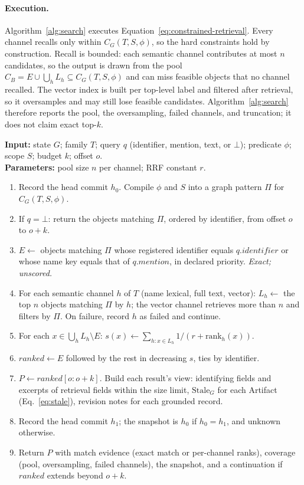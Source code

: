 \documentclass[sigconf,review,anonymous]{acmart}
\begin{document}
\paragraph{Execution.}
Algorithm~\ref{alg:search} executes Equation~\ref{eq:constrained-retrieval}.
Every channel recalls only within $C_G(T,S,\phi)$, so the hard constraints hold
by construction. Recall is bounded: each semantic channel contributes at most
$n$ candidates, so the output is drawn from the pool
$\widehat C_B = E\cup\bigcup_h L_h \subseteq C_G(T,S,\phi)$ and can miss
feasible objects that no channel recalled. The vector index is built per
top-level label and filtered after retrieval, so it oversamples and may still
lose feasible candidates. Algorithm~\ref{alg:search} therefore reports the
pool, the oversampling, failed channels, and truncation; it does not claim
exact top-$k$.

\begin{algorithm}[tbp]
\caption{\textsc{Search}: constrained hybrid retrieval}
\label{alg:search}
\raggedright
\textbf{Input:} state $G$; family $T$; query $q$ (identifier, mention, text,
or $\bot$); predicate $\phi$; scope $S$; budget $k$; offset $o$.\\
\textbf{Parameters:} pool size $n$ per channel; RRF constant $r$.
\begin{enumerate}
  \item Record the head commit $h_0$. Compile $\phi$ and $S$ into a graph
    pattern $\Pi$ for $C_G(T,S,\phi)$.
  \item If $q=\bot$: return the objects matching $\Pi$, ordered by
    identifier, from offset $o$ to $o+k$.
  \item $E\gets$ objects matching $\Pi$ whose registered identifier equals
    $q.\mathit{identifier}$ or whose name key equals that of
    $q.\mathit{mention}$, in declared priority. \hfill\emph{Exact; unscored.}
  \item For each semantic channel $h$ of $T$ (name lexical, full text,
    vector): $L_h\gets$ the top $n$ objects matching $\Pi$ by $h$; the vector
    channel retrieves more than $n$ and filters by $\Pi$. On failure, record
    $h$ as failed and continue.
  \item For each $x\in\bigcup_h L_h\setminus E$:
    $s(x)\gets\sum_{h: x\in L_h} 1/(r+\mathrm{rank}_h(x))$.
  \item $\mathit{ranked}\gets E$ followed by the rest in decreasing $s$, ties
    by identifier.
  \item $P\gets\mathit{ranked}[o:o+k]$. Build each result's view:
    identifying fields and excerpts of retrieval fields within the size
    limit, $\mathrm{Stale}_G$ for each Artifact
    (Eq.~\ref{eq:stale}), revision notes for each grounded record.
  \item Record the head commit $h_1$; the snapshot is $h_0$ if $h_0=h_1$, and
    unknown otherwise.
  \item Return $P$ with match evidence (exact match or per-channel ranks),
    coverage (pool, oversampling, failed channels), the snapshot, and a
    continuation if $\mathit{ranked}$ extends beyond $o+k$.
\end{enumerate}
\end{algorithm}
\end{document}
